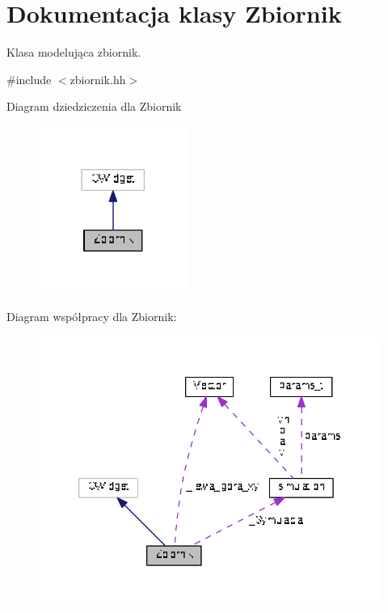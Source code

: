\hypertarget{class_zbiornik}{}\section{Dokumentacja klasy Zbiornik}
\label{class_zbiornik}


Klasa modelująca zbiornik.  




{\ttfamily \#include $<$zbiornik.\+hh$>$}



Diagram dziedziczenia dla Zbiornik\nopagebreak
\begin{figure}[H]
\begin{center}
\leavevmode
\includegraphics[width=138pt]{class_zbiornik__inherit__graph}
\end{center}
\end{figure}


Diagram współpracy dla Zbiornik\+:
\nopagebreak
\begin{figure}[H]
\begin{center}
\leavevmode
\includegraphics[width=339pt]{class_zbiornik__coll__graph}
\end{center}
\end{figure}
